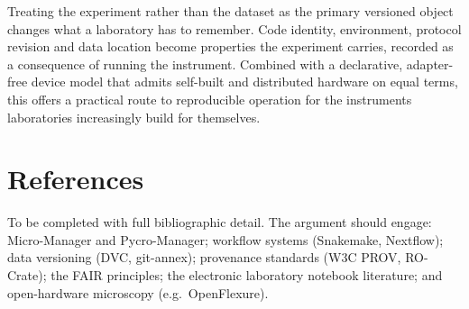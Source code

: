 \documentclass[10pt,a4paper,twocolumn]{article}
\begin{document}
Treating the experiment rather than the dataset as the primary versioned object changes
what a laboratory has to remember. Code identity, environment, protocol revision and
data location become properties the experiment carries, recorded as a consequence of
running the instrument. Combined with a declarative, adapter-free device model that
admits self-built and distributed hardware on equal terms, this offers a practical
route to reproducible operation for the instruments laboratories increasingly build for
themselves.

\section*{References}
\footnotesize
To be completed with full bibliographic detail. The argument should engage:
Micro-Manager and Pycro-Manager; workflow systems (Snakemake, Nextflow); data
versioning (DVC, git-annex); provenance standards (W3C PROV, RO-Crate); the FAIR
principles; the electronic laboratory notebook literature; and open-hardware
microscopy (e.g.\ OpenFlexure).
\end{document}

